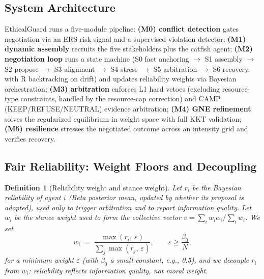 \documentclass[11pt]{article}
\newtheorem{definition}[theorem]{Definition}
\begin{document}
\subsection{System Architecture}
\label{sec:arch}
EthicalGuard runs a five-module pipeline: \textbf{(M0) conflict detection}
gates negotiation via an ERS risk signal and a supervised violation detector;
\textbf{(M1) dynamic assembly} recruits the five stakeholders plus the catfish
agent; \textbf{(M2) negotiation loop} runs a state machine (S0 fact anchoring
$\to$ S1 assembly $\to$ S2 propose $\to$ S3 alignment $\to$ S4 stress $\to$
S5 arbitration $\to$ S6 recovery, with R backtracking on drift) and updates
reliability weights via Bayesian orchestration; \textbf{(M3) arbitration}
\label{sec:arbitration} enforces L1 hard vetoes (excluding resource-type
constraints, handled by the resource-cap correction) and CAMP
(KEEP/REFUSE/NEUTRAL) evidence arbitration; \textbf{(M4) GNE refinement}
solves the regularized equilibrium in weight space with full KKT validation;
\textbf{(M5) resilience} stresses the negotiated outcome across an intensity
grid and verifies recovery.

\subsection{Fair Reliability: Weight Floors and Decoupling}
\label{sec:fairness}
\begin{definition}[Reliability weight and stance weight]
Let $r_i$ be the Bayesian reliability of agent $i$ (Beta posterior mean,
updated by whether its proposal is adopted), used \emph{only} to trigger
arbitration and to report information quality. Let $w_i$ be the stance weight
used to form the collective vector $v = \sum_i w_i \alpha_i / \sum_i w_i$. We
set
\begin{equation}
  w_i \;=\; \frac{\max(r_i,\ \varepsilon)}{\sum_j \max(r_j,\ \varepsilon)},
  \qquad \varepsilon \ge \frac{\beta_0}{N},
  \label{eq:weight-floor}
\end{equation}
for a minimum weight $\varepsilon$ (with $\beta_0$ a small constant, e.g.,
0.5), and we \emph{decouple} $r_i$ from $w_i$: reliability reflects
information quality, not moral weight.
\end{definition}
\end{document}
